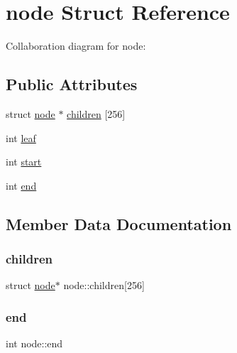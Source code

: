 \hypertarget{structnode}{}\section{node Struct Reference}
\label{structnode}


Collaboration diagram for node\+:
\subsection*{Public Attributes}
\begin{DoxyCompactItemize}
\item 
struct \hyperlink{structnode}{node} $\ast$ \hyperlink{structnode_a7db05ff303f727a214d0baf68e0667ff}{children} \mbox{[}256\mbox{]}
\item 
int \hyperlink{structnode_a5a264428e8e15b47314f13eae5a9e619}{leaf}
\item 
int \hyperlink{structnode_a224812f32f1af1c657f6a49be49ae83e}{start}
\item 
int \hyperlink{structnode_a1f8d26d45bf01fe9152688318f1d7479}{end}
\end{DoxyCompactItemize}


\subsection{Member Data Documentation}
\mbox{\label{structnode_a7db05ff303f727a214d0baf68e0667ff}} 
\subsubsection{\texorpdfstring{children}{children}}
{\footnotesize\ttfamily struct \hyperlink{structnode}{node}$\ast$ node\+::children\mbox{[}256\mbox{]}}

\mbox{\label{structnode_a1f8d26d45bf01fe9152688318f1d7479}} 
\subsubsection{\texorpdfstring{end}{end}}
{\footnotesize\ttfamily int node\+::end}

\mbox{\label{structnode_a5a264428e8e15b47314f13eae5a9e619}} 
